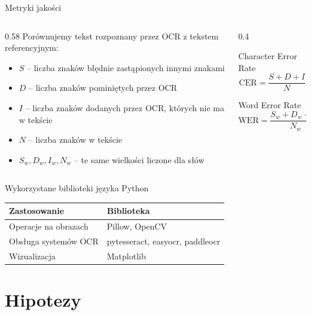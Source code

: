 \documentclass[aspectratio=169,11pt]{beamer}
\begin{document}
\begin{frame}{Metryki jakości}
  \begin{columns}[T]
    \begin{column}{0.58\textwidth}
      \small
      Porównujemy tekst rozpoznany przez OCR z tekstem referencyjnym:
      \begin{itemize}
        \item $S$ -- liczba znaków błędnie zastąpionych innymi znakami
        \item $D$ -- liczba znaków pominiętych przez OCR
        \item $I$ -- liczba znaków dodanych przez OCR, których nie ma w tekście
        \item $N$ -- liczba znaków w tekście 
        \item $S_w, D_w, I_w, N_w$ -- te same wielkości liczone dla słów
      \end{itemize}
    \end{column}
    \begin{column}{0.4\textwidth}
      \begin{block}{Character Error Rate}
        \[ \mathrm{CER} = \frac{S + D + I}{N} \]
      \end{block}
      \begin{block}{Word Error Rate}
        \[ \mathrm{WER} = \frac{S_w + D_w + I_w}{N_w} \]
      \end{block}
    \end{column}
  \end{columns}
\end{frame}


\begin{frame}{Wykorzystane biblioteki języka Python}
  \begin{center}
    \begin{tabular}{ll}
      \toprule
      Zastosowanie & Biblioteka \\
      \midrule
      Operacje na obrazach & Pillow, OpenCV \\
      Obsługa systemów OCR & pytesseract, easyocr, paddleocr \\
      Wizualizacja & Matplotlib \\
      \bottomrule
    \end{tabular}
  \end{center}
\end{frame}

\section{Hipotezy}
\end{document}
